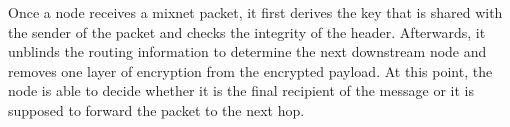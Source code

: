 Once a node receives a mixnet packet, it first derives the key that is shared with the sender of the packet and checks the integrity of the header. Afterwards, it unblinds the routing information to determine the next downstream node and removes one layer of encryption from the encrypted payload. At this point, the node is able to decide whether it is the final recipient of the message or it is supposed to forward the packet to the next hop.

\begin{comment}
\paragraph{Notation:}Let $\kappa=128$ be the security parameter. With non-negligible probability, an adversary must perform around $2^\kappa$ operations to break the security of Sphinx.

Let $r$ be the maximum number of nodes that a Sphinx mix message will traverse before being delivered to its destination.

$G$ is a prime order cyclic group satisfying the decisional Diffie-Hellman assumption \cite{Boneh_1998}. We use the secp256k1 elliptic curve \cite{secp}. The element $g$ is a generator of $G$ and $q$ is the (prime) order of $G$, with $q\approx2^{2*\kappa}$.

$G^*$ is the set of non-identity elements of G. $h_b$ is a pre-image resistant hash function used to compute blinding factors and modelled as a random oracle such that
$h_b:G^*\times G^*\rightarrow\mathbb{Z}^*_q$, where $\mathbb{Z}^*_q$ is the field of non-identity elements of $\mathbb{Z}_q$ (field of integers). We use the BLAKE2s hash function \cite{blake2}.

Each node $i$ has a private key $x_{i}\in \mathbb{Z}^*_q$ and a public key $y_{i}=g^{x_{i}}\in G^*$.
$\alpha_i$ is the group elements which, when combined with the nodes’ public keys, allow a shared key to be computed for each via Diffie-Hellman (DH) key exchange. This ensures that each node in the user-chosen route can forward the packet to the next, and only the receiving mix node can decrypt it.
$s_i$ are the DH shared secrets, $b_i$ are the blinding factors.
\end{comment}








